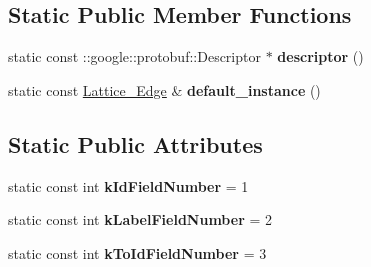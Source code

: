\subsection*{Static Public Member Functions}
\begin{DoxyCompactItemize}
\item 
\hypertarget{classlattice_1_1Lattice__Edge_a65852986232fb6963efbbc6fefd896be}{
static const ::google::protobuf::Descriptor $\ast$ {\bfseries descriptor} ()}
\label{classlattice_1_1Lattice__Edge_a65852986232fb6963efbbc6fefd896be}

\item 
\hypertarget{classlattice_1_1Lattice__Edge_ad6eb7c57bf5d859752e7e88bd7329469}{
static const \hyperlink{classlattice_1_1Lattice__Edge}{Lattice\_\-Edge} \& {\bfseries default\_\-instance} ()}
\label{classlattice_1_1Lattice__Edge_ad6eb7c57bf5d859752e7e88bd7329469}

\end{DoxyCompactItemize}
\subsection*{Static Public Attributes}
\begin{DoxyCompactItemize}
\item 
\hypertarget{classlattice_1_1Lattice__Edge_a0e2f2cee5173639eda89756b70265596}{
static const int {\bfseries kIdFieldNumber} = 1}
\label{classlattice_1_1Lattice__Edge_a0e2f2cee5173639eda89756b70265596}

\item 
\hypertarget{classlattice_1_1Lattice__Edge_a5c0b87e3bc9390f398cf3e2de0c19ca0}{
static const int {\bfseries kLabelFieldNumber} = 2}
\label{classlattice_1_1Lattice__Edge_a5c0b87e3bc9390f398cf3e2de0c19ca0}

\item 
\hypertarget{classlattice_1_1Lattice__Edge_a3bf87977ee5b7e5f33486c382fbac72f}{
static const int {\bfseries kToIdFieldNumber} = 3}
\label{classlattice_1_1Lattice__Edge_a3bf87977ee5b7e5f33486c382fbac72f}

\end{DoxyCompactItemize}
